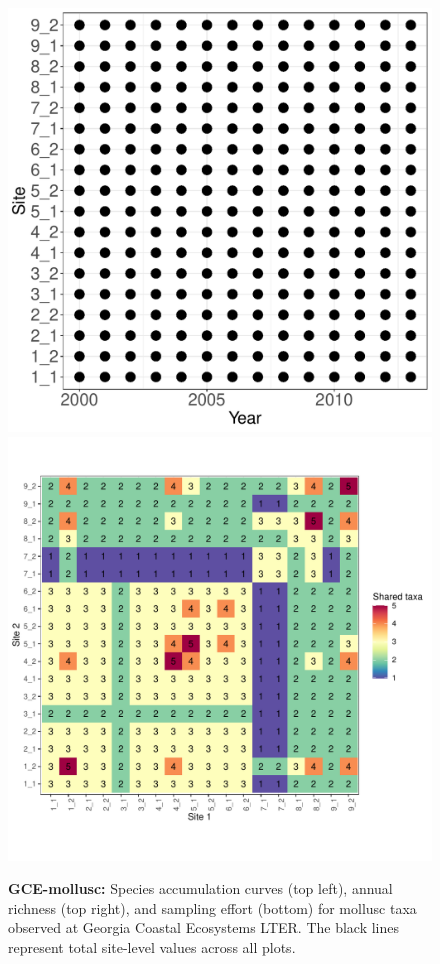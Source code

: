 \documentclass[11pt, oneside]{article}
\begin{document}
\begin{figure}[h!]
\includegraphics[scale = 0.4]{gce-mollusc-compagnoni_spatiotemporal_sampling_effort.pdf}
\includegraphics[scale = 0.4]{gce-mollusc-compagnoni_spp_shared.pdf}
\caption{{\bf GCE-mollusc:} Species accumulation curves (top left),  annual richness (top right), and sampling effort (bottom)  for mollusc taxa observed at Georgia Coastal Ecosystems LTER. The black lines represent total site-level values across all plots.}
\label{gce-mollusc}
\end{figure}
\end{document}

